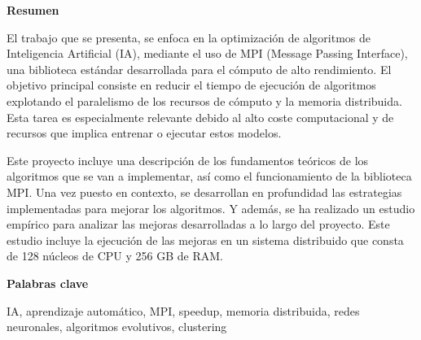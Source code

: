 
\newpage

\thispagestyle{empty}

\begin{center}

{\bf \Huge Resumen}

  \end{center}
\vspace{1cm}

El trabajo que se presenta, se enfoca en la optimización de algoritmos de Inteligencia  Artificial (IA), mediante el uso de MPI (Message Passing Interface), una biblioteca estándar desarrollada para el cómputo de alto rendimiento. 
El objetivo principal consiste en reducir el tiempo de ejecución de algoritmos explotando el paralelismo de los recursos de cómputo y la memoria distribuida. Esta tarea es especialmente relevante debido al alto coste computacional y de recursos que implica entrenar o ejecutar estos modelos.

Este proyecto incluye una descripción de los fundamentos teóricos de los algoritmos que se van a implementar, así como el funcionamiento de la biblioteca MPI. 
Una vez puesto en contexto, se desarrollan en profundidad las estrategias implementadas para mejorar los algoritmos.
Y además, se ha realizado un estudio empírico para analizar las mejoras desarrolladas a lo largo del proyecto. Este estudio incluye la ejecución de las mejoras en un sistema distribuido que consta de 128 núcleos de CPU y 256 GB de RAM.



\vspace{1cm}


\begin{center}

{\bf \Large Palabras clave}

   \end{center}

   \vspace{0.5cm}
   
   IA, aprendizaje automático, MPI, speedup, memoria distribuida, redes neuronales, algoritmos evolutivos, clustering
   
   


